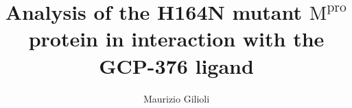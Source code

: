 \documentclass[fleqn,10pt]{wlscirep}
\title{Analysis of the H164N mutant $\text{M}^{\text{pro}}$ protein in interaction with the GCP-376 ligand}
\date{}
\author[]{Maurizio Gilioli}
\begin{document}
\maketitle

\tableofcontents















% 
{\footnotesize
}
\end{document}
